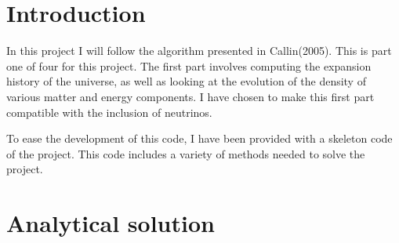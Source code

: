 \documentclass{aa}   %
\begin{document}
  


\section{Introduction}\label{sec:introduction}
In this project I will follow the algorithm presented in Callin(2005). This is part one of four for this project.
The first part involves computing the expansion history of the universe, as well as looking at the evolution of the density of various matter and energy components.
I have chosen to make this first part compatible with the inclusion of neutrinos. 

To ease the development of this code, I have been provided with a skeleton code of the project. This code includes a variety of methods needed to solve the project.

\section{Analytical solution}\label{sec:analytical}

\end{document}
